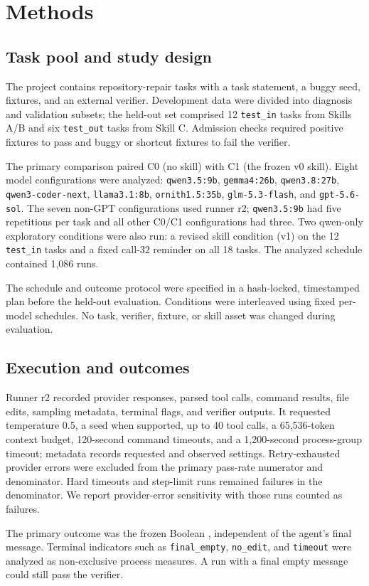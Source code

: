 \documentclass[10pt]{article}
\newcommand{\QwenWeak}{\texttt{qwen3.5:\allowbreak 9b}}
\newcommand{\Gemma}{\texttt{gemma4:\allowbreak 26b}}
\newcommand{\QwenStrong}{\texttt{qwen3.8:\allowbreak 27b}}
\newcommand{\Coder}{\texttt{qwen3-coder-next}}
\newcommand{\Llama}{\texttt{llama3.1:\allowbreak 8b}}
\newcommand{\Ornith}{\texttt{ornith1.5:\allowbreak 35b}}
\newcommand{\GLM}{\texttt{glm-5.3-flash}}
\newcommand{\GPT}{\texttt{gpt-5.6-sol}}
\begin{document}
\section{Methods}
\subsection{Task pool and study design}
The project contains repository-repair tasks with a task statement, a buggy seed, fixtures, and an external verifier. Development data were divided into diagnosis and validation subsets; the held-out set comprised 12 \texttt{test\_in} tasks from Skills A/B and six \texttt{test\_out} tasks from Skill C. Admission checks required positive fixtures to pass and buggy or shortcut fixtures to fail the verifier.

The primary comparison paired C0 (no skill) with C1 (the frozen v0 skill). Eight model configurations were analyzed: \QwenWeak{}, \Gemma{}, \QwenStrong{}, \Coder{}, \Llama{}, \Ornith{}, \GLM{}, and \GPT{}. The seven non-GPT configurations used runner r2; \QwenWeak{} had five repetitions per task and all other C0/C1 configurations had three. Two qwen-only exploratory conditions were also run: a revised skill condition (v1) on the 12 \texttt{test\_in} tasks and a fixed call-32 reminder on all 18 tasks. The analyzed schedule contained 1,086 runs.

The schedule and outcome protocol were specified in a hash-locked, timestamped plan before the held-out evaluation. Conditions were interleaved using fixed per-model schedules. No task, verifier, fixture, or skill asset was changed during evaluation.

\subsection{Execution and outcomes}
Runner r2 recorded provider responses, parsed tool calls, command results, file edits, sampling metadata, terminal flags, and verifier outputs. It requested temperature 0.5, a seed when supported, up to 40 tool calls, a 65,536-token context budget, 120-second command timeouts, and a 1,200-second process-group timeout; metadata records requested and observed settings. Retry-exhausted provider errors were excluded from the primary pass-rate numerator and denominator. Hard timeouts and step-limit runs remained failures in the denominator. We report provider-error sensitivity with those runs counted as failures.

The primary outcome was the frozen Boolean , independent of the agent's final message. Terminal indicators such as \texttt{final\_empty}, \texttt{no\_edit}, and \texttt{timeout} were analyzed as non-exclusive process measures. A run with a final empty message could still pass the verifier.
\end{document}
